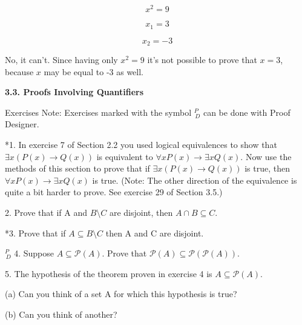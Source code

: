 \documentclass{article}
\begin{document}
$$x^2 = 9$$

$$x_1 = 3$$

$$x_2 = -3$$

No, it can't. Since having only $x^2 = 9$ it's not possible to prove that $x = 3$, because $x$ may be equal to -3 as well.
\vspace{50pt}

\textbf{3.3. Proofs Involving Quantifiers}

Exercises
Note: Exercises marked with the symbol $^{\textit{P}}_{\, \textit{D}}$ can be done with Proof Designer.
\vspace{30pt}

*1. In exercise 7 of Section 2.2 you used logical equivalences to show that
$\exists x(P(x) \to Q(x))$ is equivalent to $\forall x P(x) \to \exists x Q(x)$. Now use the
methods of this section to prove that if $\exists x(P(x) \to Q(x))$ is true, then
$\forall x P(x) \to \exists x Q(x)$ is true. (Note: The other direction of the equivalence
is quite a bit harder to prove. See exercise 29 of Section 3.5.)
\vspace{30pt}



\vspace{30pt}

2. Prove that if A and $B \setminus C$ are disjoint, then $A \cap B \subseteq C$.
\vspace{30pt}



\vspace{30pt}

*3. Prove that if $A \subseteq B \setminus C$ then A and C are disjoint.
\vspace{30pt}



\vspace{30pt}

$^{\textit{P}}_{\, \textit{D}}$ 4. Suppose $A \subseteq \mathcal{P} (A)$. Prove that $\mathcal{P} (A) \subseteq \mathcal{P} (\mathcal{P} (A))$.
\vspace{30pt}



\vspace{30pt}

5. The hypothesis of the theorem proven in exercise 4 is $A \subseteq \mathcal{P} (A)$.

\hspace{12pt}(a) Can you think of a set A for which this hypothesis is true?

\hspace{12pt}(b) Can you think of another?
\vspace{30pt}
\end{document}
